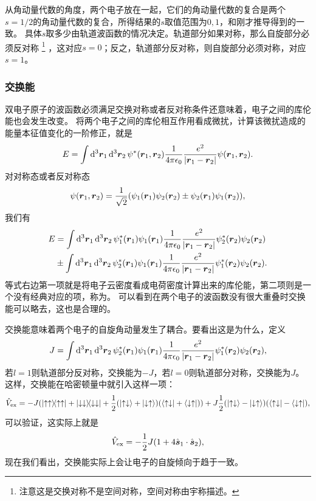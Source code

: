 从角动量代数的角度，两个电子放在一起，它们的角动量代数的复合是两个$s=1/2$的角动量代数的复合，所得结果的$s$取值范围为$0, 1$，和刚才推导得到的一致。
具体$s$取多少由轨道波函数的情况决定。轨道部分如果对称，那么自旋部分必须反对称%
\footnote{注意这是交换对称不是空间对称，空间对称由宇称描述。}%
，这对应$s=0$；反之，轨道部分反对称，则自旋部分必须对称，对应$s=1$。

\subsubsection{交换能}

双电子原子的波函数必须满足交换对称或者反对称条件还意味着，电子之间的库伦能也会发生改变。
将两个电子之间的库伦相互作用看成微扰，计算该微扰造成的能量本征值变化的一阶修正，就是
\begin{equation}
    E = \int \dd[3]{\vb*{r}_1} \dd[3]{\vb*{r}_2} \psi^*(\vb*{r}_1, \vb*{r}_2) \frac{1}{4\pi \epsilon_0} \frac{e^2}{\abs{\vb*{r}_1 - \vb*{r}_2}} \psi(\vb*{r}_1, \vb*{r}_2).
\end{equation}
对对称态或者反对称态
\[
    \psi(\vb*{r}_1, \vb*{r}_2) = \frac{1}{\sqrt{2}} (\psi_1(\vb*{r}_1) \psi_2(\vb*{r}_2) \pm \psi_2(\vb*{r}_1) \psi_1(\vb*{r}_2)),
\]
我们有
\begin{equation}
    \begin{aligned}
        E &= \int \dd[3]{\vb*{r}_1} \dd[3]{\vb*{r}_2} \psi_1^*(\vb*{r}_1) \psi_1(\vb*{r}_1) \frac{1}{4\pi \epsilon_0} \frac{e^2}{\abs{\vb*{r}_1 - \vb*{r}_2}} \psi_2^*(\vb*{r}_2) \psi_2(\vb*{r}_2) \\
        &\pm \int \dd[3]{\vb*{r}_1} \dd[3]{\vb*{r}_2} \psi_2^*(\vb*{r}_1) \psi_1(\vb*{r}_1) \frac{1}{4\pi \epsilon_0} \frac{e^2}{\abs{\vb*{r}_1 - \vb*{r}_2}} \psi_1^*(\vb*{r}_2) \psi_2(\vb*{r}_2).
    \end{aligned}
\end{equation}
等式右边第一项就是将电子云密度看成电荷密度计算出来的库伦能，第二项则是一个没有经典对应的项，称为。
可以看到在两个电子的波函数没有很大重叠时交换能可以略去，这也是合理的。

交换能意味着两个电子的自旋角动量发生了耦合。要看出这是为什么，定义
\begin{equation}
    J = \int \dd[3]{\vb*{r}_1} \dd[3]{\vb*{r}_2} \psi_2^*(\vb*{r}_1) \psi_1(\vb*{r}_1) \frac{1}{4\pi \epsilon_0} \frac{e^2}{\abs{\vb*{r}_1 - \vb*{r}_2}} \psi_1^*(\vb*{r}_2) \psi_2(\vb*{r}_2),
\end{equation}
若$l=1$则轨道部分反对称，交换能为$-J$，若$l=0$则轨道部分对称，交换能为$J$。这样，交换能在哈密顿量中就引入这样一项：
\[
    \hat{V}_\text{ex} = -J ( \dyad{\uparrow \uparrow} + \dyad{\downarrow \downarrow} + \frac{1}{2} (\ket{\uparrow \downarrow} + \ket{\downarrow \uparrow}) (\bra{\uparrow \downarrow} + \bra{\downarrow \uparrow}) ) + J \frac{1}{2} (\ket{\uparrow \downarrow} - \ket{\downarrow \uparrow}) (\bra{\uparrow \downarrow} - \bra{\downarrow \uparrow}),
\]
可以验证，这实际上就是
\begin{equation}
    \hat{V}_\text{ex} = - \frac{1}{2} J (1 + 4 \hat{\vb*{s}}_1 \cdot \hat{\vb*{s}}_2),
\end{equation}
现在我们看出，交换能实际上会让电子的自旋倾向于趋于一致。

